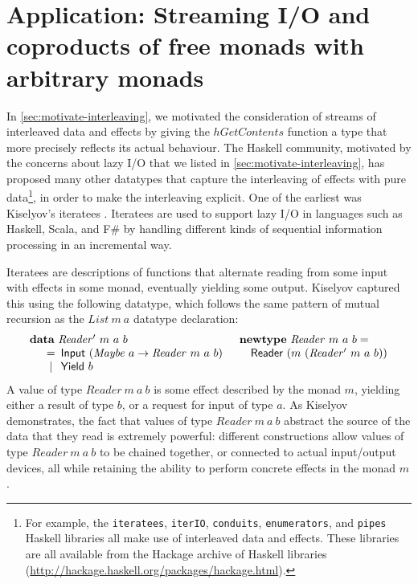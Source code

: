 \documentclass{jfp1}
\newcommand{\kw}[1]{\textbf{#1}}
\begin{document}
\section{Application: Streaming I/O and coproducts of free monads with arbitrary monads}
\label{sec:coproducts-with-free-monads}

In \autoref{sec:motivate-interleaving}, we motivated the consideration
of streams of interleaved data and effects by giving the
$\mathit{hGetContents}$ function a type that more precisely reflects
its actual behaviour. The Haskell community, motivated by the concerns
about lazy I/O that we listed in \autoref{sec:motivate-interleaving},
has proposed many other datatypes that capture the interleaving of
effects with pure data\footnote{For example, the \texttt{iteratees},
  \texttt{iterIO}, \texttt{conduits}, \texttt{enumerators}, and
  \texttt{pipes} Haskell libraries all make use of interleaved data
  and effects. These libraries are all available from the Hackage
  archive of Haskell libraries
  (\url{http://hackage.haskell.org/packages/hackage.html}).}, in order
to make the interleaving explicit. One of the earliest was Kiselyov's
iteratees \cite{kiselyov12iteratees}.  Iteratees are used to support
lazy I/O in languages such as Haskell, Scala, and F\# by handling
different kinds of sequential information processing in an incremental
way.

Iteratees are descriptions of functions that alternate reading from
some input with effects in some monad, eventually yielding some
output. Kiselyov captured this using the following datatype, which
follows the same pattern of mutual recursion as the
$\mathit{List}~m~a$ datatype declaration:
\begin{displaymath}
  \begin{array}{ll}
    \kw{data}~\mathit{Reader'}~m~a~b
    &
    \kw{newtype}~\mathit{Reader}~m~a~b = 
    \\
    \quad
    \begin{array}[t]{c@{\hspace{0.5em}}l}
      = & \mathsf{Input}~(\mathit{Maybe}~a \to \mathit{Reader}~m~a~b) \\
      | & \mathsf{Yield}~b
    \end{array}
    &
    \quad \mathsf{Reader}~(m~(\mathit{Reader'}~m~a~b))
  \end{array}
\end{displaymath}
A value of type $\mathit{Reader}~m~a~b$ is some effect described by
the monad $m$, yielding either a result of type $b$, or a request for
input of type $a$. As Kiselyov demonstrates, the fact that values of
type $\mathit{Reader}~m~a~b$ abstract the source of the data that they
read is extremely powerful: different constructions allow values of
type $\mathit{Reader}~m~a~b$ to be chained together, or connected to
actual input/output devices, all while retaining the ability to
perform concrete effects in the monad $m$.
\end{document}
